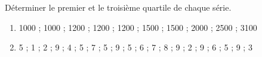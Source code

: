 
\begin{exercice}\label{exoSeconde-0015}

Déterminer le premier et le troisième quartile de chaque série.

\begin{enumerate}
\item 1000 ; 1000 ; 1200 ; 1200 ; 1200 ; 1500 ; 1500 ; 2000 ; 2500 ; 3100 
\item  5 ; 1 ; 2 ; 9 ; 4 ; 5 ; 7 ; 5 ; 9 ; 5 ; 6 ; 7 ; 8 ; 9 ; 2 ; 9 ; 6 ; 5 ; 9 ; 3
\end{enumerate}

\end{exercice}
